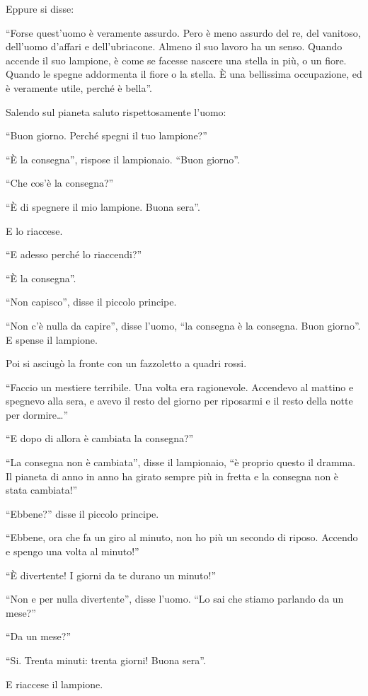 \documentclass[11pt]{scrbook}
\begin{document}
Eppure si disse:

``Forse quest'uomo è veramente assurdo. Pero è meno assurdo del re, del vanitoso, dell'uomo d'affari e dell'ubriacone. Almeno il suo lavoro ha un senso. Quando accende il suo lampione, è come se facesse nascere una stella in più, o un fiore. Quando le spegne addormenta il fiore o la stella. È una bellissima occupazione, ed è veramente utile, perché è bella''.

Salendo sul pianeta saluto rispettosamente l'uomo:

``Buon giorno. Perché spegni il tuo lampione?''

``È la consegna'', rispose il lampionaio. ``Buon giorno''.

``Che cos'è la consegna?''

``È di spegnere il mio lampione. Buona sera''.

E lo riaccese.

``E adesso perché lo riaccendi?''

``È la consegna''.

``Non capisco'', disse il piccolo principe.

``Non c'è nulla da capire'', disse l'uomo, ``la consegna è la consegna. Buon giorno''. E spense il lampione.

Poi si asciugò la fronte con un fazzoletto a quadri rossi.

``Faccio un mestiere terribile. Una volta era ragionevole. Accendevo al mattino e spegnevo alla sera, e avevo il resto del giorno per riposarmi e il resto della notte per dormire\ldots{}''

``E dopo di allora è cambiata la consegna?''

``La consegna non è cambiata'', disse il lampionaio, ``è proprio questo il dramma. Il pianeta di anno in anno ha girato sempre più in fretta e la consegna non è stata cambiata!''

``Ebbene?'' disse il piccolo principe.

``Ebbene, ora che fa un giro al minuto, non ho più un secondo di riposo. Accendo e spengo una volta al minuto!''

``È divertente! I giorni da te durano un minuto!''

``Non e per nulla divertente'', disse l'uomo. ``Lo sai che stiamo parlando da un mese?''

``Da un mese?''

``Si. Trenta minuti: trenta giorni! Buona sera''.

E riaccese il lampione.
\end{document}
